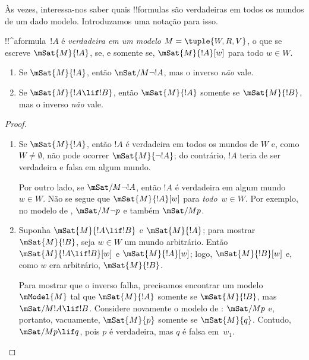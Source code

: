 \documentclass[../../../include/open-logic-section]{subfiles}
\begin{document}


Às vezes, interessa-nos saber quais !!{formula}s são verdadeiras em todos
os mundos de um dado modelo. Introduzamos uma notação para isso.

\begin{defn}
  !!^a{formula}~$!A$ é \emph{verdadeira em um modelo} $M = \tuple{W, R,
    V}$, o que se escreve $\mSat{M}{!A}$, se, e somente se,
  $\mSat{M}{!A}[w]$ para todo $w \in W$.
\end{defn}

\begin{prop}
  \begin{enumerate}
  \item Se $\mSat{M}{!A}$, então $\mSat/{M}{\lnot !A}$, mas o inverso
    \emph{não} vale.
  \item Se $\mSat{M}{!A \lif !B}$, então $\mSat{M}{!A}$ somente se
    $\mSat{M}{!B}$, mas o inverso \emph{não} vale.
  \end{enumerate}
\end{prop}

\begin{proof}
  \begin{enumerate}
  \item Se $\mSat{M}{!A}$, então $!A$ é verdadeira em todos os mundos
    de $W$ e, como $W \neq \emptyset$, não pode ocorrer
    $\mSat{M}{\lnot!A}$; do contrário, $!A$ teria de ser verdadeira e
    falsa em algum mundo.

    Por outro lado, se $\mSat/{M}{\lnot !A}$, então $!A$ é verdadeira
    em algum mundo $w \in W$. Não se segue que $\mSat{M}{!A}[w]$ para
    \emph{todo}~$w \in W$. Por exemplo, no modelo de
    , $\mSat/{M}{\lnot p}$ e também $\mSat/{M}{p}$.
  \item Suponha $\mSat{M}{!A \lif !B}$ e $\mSat{M}{!A}$; para mostrar
    $\mSat{M}{!B}$, seja $w \in W$ um mundo arbitrário. Então
    $\mSat{M}{!A \lif !B}[w]$ e $\mSat{M}{!A}[w]$; logo,
    $\mSat{M}{!B}[w]$ e, como $w$ era arbitrário,
    $\mSat{M}{!B}$.

    Para mostrar que o inverso falha, precisamos encontrar um modelo
    $\mModel{M}$ tal que $\mSat{M}{!A}$ somente se $\mSat{M}{!B}$, mas
    $\mSat/{M}{!A \lif !B}$. Considere novamente o modelo de
    : $\mSat/{M}{p}$ e, portanto, vacuamente,
    $\mSat{M}{p}$ somente se $\mSat{M}{q}$. Contudo, $\mSat/{M}{p \lif
      q}$, pois $p$ é verdadeira, mas $q$ é falsa em~$w_1$.
  \end{enumerate}
\end{proof}
\end{document}
